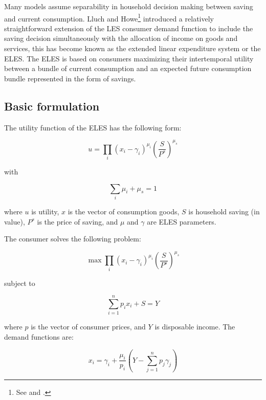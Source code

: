 
Many models assume separability in household decision making between saving and current consumption.
Lluch and Howe\footnote{See \cite{Lluch1973} and \cite{Howe1975}.} introduced a relatively
straightforward extension of the LES consumer demand function to include the saving decision
simultaneously with the allocation of income on goods and services, this has become known as the
extended linear expenditure system or the ELES. The ELES is based on consumers maximizing their
intertemporal utility between a bundle of current consumption and an expected future consumption
bundle represented in the form of savings.

\subsection{Basic formulation}

The utility function of the ELES has the following form:

\begin{equation}
\label{eq:ELESU}
u = \prod\limits_i {\left( x_i - \gamma _i \right)^{\mu_i}}
   \left( \frac {S} {P^s} \right)^{\mu_s}
\end{equation}

\noindent with

\begin{equation}
\label{eq:ELESCONSTRAINT}
\sum\limits_i {\mu _i}  + \mu _s = 1
\end{equation}

\noindent where $u$ is utility, $x$ is the vector of consumption goods, $S$ is household saving
(in value), $P^s$ is the price of saving, and $\mu$ and $\gamma$ are ELES parameters.

The consumer solves the following problem:

\[
\max \prod\limits_i {\left( x_i - \gamma _i \right)^{\mu_i}}
   \left( \frac {S} {P^s} \right)^{\mu_s}
\]

\noindent subject to

\[\sum\limits_{i = 1}^n {{p_i}{x_i}}  + S = Y\]

\noindent where $p$ is the vector of consumer prices, and $Y$ is disposable income.
The demand functions are:

\begin{equation}
\label{eq:ELESDEMAND}
x_i = \gamma_i + \frac {\mu_i} {p_i}
   \left( Y - \sum\limits_{j = 1}^n {p_j  \gamma_j} \right)
\end{equation}

